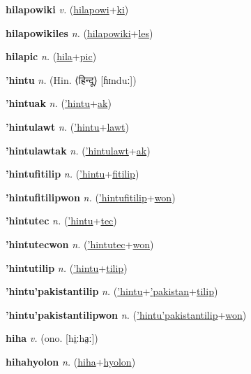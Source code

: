 \textbf{\hypertarget{hilapowiki}{hilapowiki}} \textit{v.} (\hyperlink{hilapowi}{hilapowi}+\allowbreak \hyperlink{ki}{ki})


\textbf{\hypertarget{hilapowikiles}{hilapowikiles}} \textit{n.} (\hyperlink{hilapowiki}{hilapowiki}+\allowbreak \hyperlink{les}{les})


\textbf{\hypertarget{hilapic}{hilapic}} \textit{n.} (\hyperlink{hila}{hila}+\allowbreak \hyperlink{pic}{pic})


\textbf{\hypertarget{'hintu}{'hintu}} \textit{n.} (Hin. ⟨{\devanagari{}हिन्दू}⟩ [ɦɪnduː])


\textbf{\hypertarget{'hintuak}{'hintuak}} \textit{n.} (\hyperlink{'hintu}{'hintu}+\allowbreak \hyperlink{ak}{ak})


\textbf{\hypertarget{'hintulawt}{'hintulawt}} \textit{n.} (\hyperlink{'hintu}{'hintu}+\allowbreak \hyperlink{lawt}{lawt})


\textbf{\hypertarget{'hintulawtak}{'hintulawtak}} \textit{n.} (\hyperlink{'hintulawt}{'hintulawt}+\allowbreak \hyperlink{ak}{ak})


\textbf{\hypertarget{'hintufitilip}{'hintufitilip}} \textit{n.} (\hyperlink{'hintu}{'hintu}+\allowbreak \hyperlink{fitilip}{fitilip})


\textbf{\hypertarget{'hintufitilipwon}{'hintufitilipwon}} \textit{n.} (\hyperlink{'hintufitilip}{'hintufitilip}+\allowbreak \hyperlink{won}{won})


\textbf{\hypertarget{'hintutec}{'hintutec}} \textit{n.} (\hyperlink{'hintu}{'hintu}+\allowbreak \hyperlink{tec}{tec})


\textbf{\hypertarget{'hintutecwon}{'hintutecwon}} \textit{n.} (\hyperlink{'hintutec}{'hintutec}+\allowbreak \hyperlink{won}{won})


\textbf{\hypertarget{'hintutilip}{'hintutilip}} \textit{n.} (\hyperlink{'hintu}{'hintu}+\allowbreak \hyperlink{tilip}{tilip})


\textbf{\hypertarget{'hintu'pakistantilip}{'hintu'pakistantilip}} \textit{n.} (\hyperlink{'hintu}{'hintu}+\allowbreak \hyperlink{'pakistan}{'pakistan}+\allowbreak \hyperlink{tilip}{tilip})


\textbf{\hypertarget{'hintu'pakistantilipwon}{'hintu'pakistantilipwon}} \textit{n.} (\hyperlink{'hintu'pakistantilip}{'hintu'pakistantilip}+\allowbreak \hyperlink{won}{won})


\textbf{\hypertarget{hiha}{hiha}} \textit{v.} (ono. [hi̤ːha̤ː])


\textbf{\hypertarget{hihahyolon}{hihahyolon}} \textit{n.} (\hyperlink{hiha}{hiha}+\allowbreak \hyperlink{hyolon}{hyolon})


